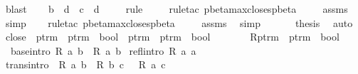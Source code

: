 \begin{isabellebody}
\ blast\isanewline
\ \ \isamarkupfalse%
\ {\isachardoublequoteopen}b\ {\isasymggreater}\ d\ {\isasymand}\ c\ {\isasymggreater}\ d{\isachardoublequoteclose}\ \isanewline
\ \ \isamarkupfalse%
\ rule\ \isanewline
\ \ \isamarkupfalse%
\ {\isacharparenleft}rule{\isacharunderscore}tac\ pbeta{\isacharunderscore}max{\isacharunderscore}closes{\isacharunderscore}pbeta{\isacharparenright}\isanewline
\ \ \isamarkupfalse%
\ {}\ assms\ \isamarkupfalse%
\ simp{\isacharplus}\isanewline
\ \ \isamarkupfalse%
\ {\isacharparenleft}rule{\isacharunderscore}tac\ pbeta{\isacharunderscore}max{\isacharunderscore}closes{\isacharunderscore}pbeta{\isacharparenright}\isanewline
\ \ \isamarkupfalse%
\ {}\ assms\ \isamarkupfalse%
\ simp{\isacharplus}\isanewline
\ \ \isamarkupfalse%
\isanewline
\ \ \isamarkupfalse%
\ {\isacharquery}thesis\ \isamarkupfalse%
\ auto\isanewline
{}\isamarkupfalse%
%
\endisatagproof
{\isafoldproof}%
%
\isadelimproof
%
\endisadelimproof
%
\isamarkuptrue%
\isamarkupfalse%
\ close\ {\isacharcolon}{\isacharcolon}\ {\isachardoublequoteopen}{\isacharparenleft}ptrm\ {\isasymRightarrow}\ ptrm\ {\isasymRightarrow}\ bool{\isacharparenright}\ {\isasymRightarrow}\ ptrm\ {\isasymRightarrow}\ ptrm\ {\isasymRightarrow}\ bool{\isachardoublequoteclose}\ {\isacharparenleft}{\isachardoublequoteopen}{\isacharunderscore}{\isacharasterisk}\ {\isacharunderscore}\ \ {\isacharunderscore}{\isachardoublequoteclose}\ {\isacharbrackleft}{}{}{\isacharcomma}{}{}{\isacharbrackright}\ {}{}{\isacharparenright}\ \ R{\isacharcolon}{\isacharcolon}{\isachardoublequoteopen}ptrm\ {\isasymRightarrow}\ ptrm\ {\isasymRightarrow}\ bool{\isachardoublequoteclose}\isanewline
{}\isanewline
\ \ base{\isacharbrackleft}intro{\isacharbrackright}{\isacharcolon}\ {\isachardoublequoteopen}R\ a\ b\ {\isasymLongrightarrow}\ R{\isacharasterisk}\ a\ b{\isachardoublequoteclose}\isanewline
{\isacharbar}\ refl{\isacharbrackleft}intro{\isacharbrackright}{\isacharcolon}\ {\isachardoublequoteopen}R{\isacharasterisk}\ a\ a{\isachardoublequoteclose}\isanewline
{\isacharbar}\ trans{\isacharbrackleft}intro{\isacharbrackright}{\isacharcolon}\ {\isachardoublequoteopen}{\isasymlbrakk}\ R{\isacharasterisk}\ a\ b\ {\isacharsemicolon}\ R{\isacharasterisk}\ b\ c\ {\isasymrbrakk}\ {\isasymLongrightarrow}\ R{\isacharasterisk}\ a\ c{\isachardoublequoteclose}\isanewline

\end{isabellebody}
